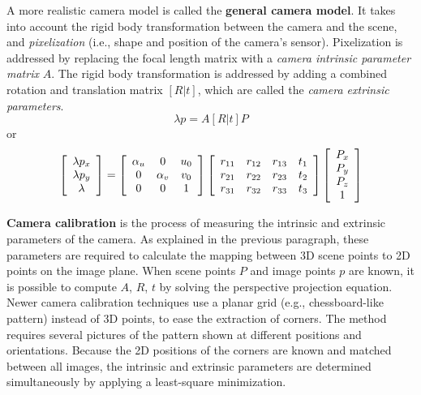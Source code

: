 A more realistic camera model is called the \textbf{general camera model}.
It takes into account the rigid body transformation between the camera and the scene, and \textit{pixelization} (i.e., shape and position of the camera's sensor).
Pixelization is addressed by replacing the focal length matrix with a \textit{camera intrinsic parameter matrix} $A$.
The rigid body transformation is addressed by adding a combined rotation and translation matrix $[R|t]$, which are called the \textit{camera extrinsic parameters}.
\begin{equation}
\lambda p = A [ R | t] P
\end{equation}
or
\begin{equation}
\left[ \begin{array}{c}
\lambda p_x \\
\lambda p_y \\
\lambda
\end{array} \right]
=
\left[ \begin{array}{c c c}
\alpha_u & 0 & u_0 \\
0 & \alpha_v & v_0 \\
0 & 0 & 1
\end{array} \right]
\left[ \begin{array}{c c c c}
r_{11} & r_{12} & r_{13} & t_1 \\
r_{21} & r_{22} & r_{23} & t_2 \\
r_{31} & r_{32} & r_{33} & t_3
\end{array} \right]
\left[ \begin{array}{c}
P_x \\
P_y \\
P_z \\
1
\end{array} \right]
\end{equation}

\textbf{Camera calibration} is the process of measuring the intrinsic and extrinsic parameters of the camera.
As explained in the previous paragraph, these parameters are required to calculate the mapping between 3D scene points to 2D points on the image plane.
When scene points $P$ and image points $p$ are known, it is possible to compute $A$, $R$, $t$ by solving the perspective projection equation.
Newer camera calibration techniques use a planar grid (e.g., chessboard-like pattern) instead of 3D points, to ease the extraction of corners.
The method requires several pictures of the pattern shown at different positions and orientations.
Because the 2D positions of the corners are known and matched between all images, the intrinsic and extrinsic parameters are determined simultaneously by applying a least-square minimization.

